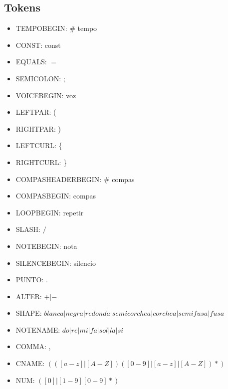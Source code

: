 {\subsection{Tokens}
\begin{itemize}
\item TEMPOBEGIN: \# tempo

\item CONST: const

\item EQUALS: $=$

\item SEMICOLON: ;

\item VOICEBEGIN: voz

\item LEFTPAR: (

\item RIGHTPAR: )

\item LEFTCURL: \{

\item RIGHTCURL: \}

\item COMPASHEADERBEGIN: \# compas

\item COMPASBEGIN: compas

\item LOOPBEGIN: repetir

\item SLASH: $/$

\item NOTEBEGIN: nota

\item SILENCEBEGIN: silencio

\item PUNTO: .

\item ALTER: $+|-$

\item SHAPE: $blanca|negra|redonda|semicorchea|corchea|semifusa|fusa$

\item NOTENAME: $do|re|mi|fa|sol|la|si$

\item COMMA: ,

\item CNAME: $(([a-z]|[A-Z])([0-9]|[a-z]|[A-Z])*)$

\item NUM: $([0]|[1-9][0-9]*)$

\end{itemize}


}
